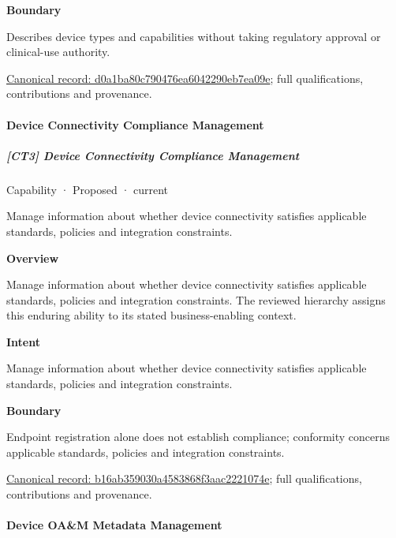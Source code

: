 \textbf{Boundary}



Describes device types and capabilities without taking regulatory approval or clinical-use authority.


{\footnotesize \href{../../../../continuum/strategy/capability/d0a1ba80c790476ea6042290eb7ea09e.md}{Canonical record: d0a1ba80c790476ea6042290eb7ea09e}; full qualifications, contributions and provenance.}\par
\paragraph{Device Connectivity Compliance Management}

\subparagraph{[CT3] Device Connectivity Compliance Management}

\label{element:b16ab359030a4583868f3aac2221074e}
{\small Capability · Proposed · current}\par

Manage information about whether device connectivity satisfies applicable standards, policies and integration constraints.



\textbf{Overview}



Manage information about whether device connectivity satisfies applicable standards, policies and integration constraints. The reviewed hierarchy assigns this enduring ability to its stated business-enabling context.



\textbf{Intent}



Manage information about whether device connectivity satisfies applicable standards, policies and integration constraints.



\textbf{Boundary}



Endpoint registration alone does not establish compliance; conformity concerns applicable standards, policies and integration constraints.


{\footnotesize \href{../../../../continuum/strategy/capability/b16ab359030a4583868f3aac2221074e.md}{Canonical record: b16ab359030a4583868f3aac2221074e}; full qualifications, contributions and provenance.}\par
\paragraph{Device OA\&M Metadata Management}


